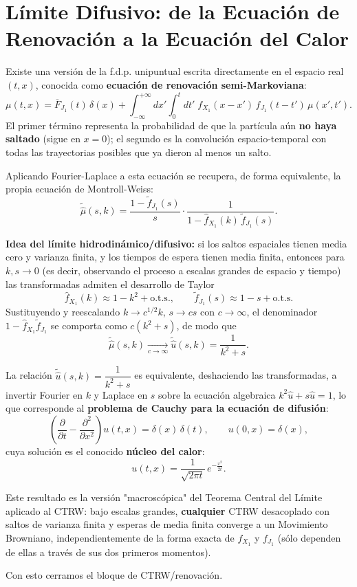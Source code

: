 \section{Límite Difusivo: de la Ecuación de Renovación a la Ecuación del Calor}

\noindent
Existe una versión de la f.d.p. unipuntual escrita directamente en el espacio real $(t,x)$, conocida como \textbf{ecuación de renovación semi-Markoviana}:
\[
\mu(t,x) = \overline{F}_{J_1}(t)\,\delta(x) + \int_{-\infty}^{+\infty} dx' \int_{0}^{t} dt' \; f_{X_1}(x-x')\, f_{J_1}(t-t')\, \mu(x',t').
\]
El primer término representa la probabilidad de que la partícula aún \textbf{no haya saltado} (sigue en $x=0$); el segundo es la convolución espacio-temporal con todas las trayectorias posibles que ya dieron al menos un salto.

\begin{observacion}
Aplicando Fourier-Laplace a esta ecuación se recupera, de forma equivalente, la propia ecuación de Montroll-Weiss:
\[
\widetilde{\hat{\mu}}(s,k) = \frac{1-\widetilde{f}_{J_1}(s)}{s} \cdot \frac{1}{1-\hat{f}_{X_1}(k)\,\widetilde{f}_{J_1}(s)}.
\]
\end{observacion}

\noindent
\textbf{Idea del límite hidrodinámico/difusivo:} si los saltos espaciales tienen media cero y varianza finita, y los tiempos de espera tienen media finita, entonces para $k,s \to 0$ (es decir, observando el proceso a escalas grandes de espacio y tiempo) las transformadas admiten el desarrollo de Taylor
\[
\hat{f}_{X_1}(k) \approx 1 - k^2 + \text{o.t.s.}, \qquad \widetilde{f}_{J_1}(s) \approx 1 - s + \text{o.t.s.}
\]
Sustituyendo y reescalando $k \to c^{1/2}k$, $s \to cs$ con $c \to \infty$, el denominador $1-\hat{f}_{X_1}\widetilde{f}_{J_1}$ se comporta como $c(k^2+s)$, de modo que
\[
\widetilde{\hat{\mu}}(s,k) \xrightarrow[c\to\infty]{} \widetilde{\hat{u}}(s,k) = \frac{1}{k^2+s}.
\]

\begin{teo}
La relación $\widetilde{\hat u}(s,k)=\dfrac{1}{k^2+s}$ es equivalente, deshaciendo las transformadas, a invertir Fourier en $k$ y Laplace en $s$ sobre la ecuación algebraica $k^2\hat u + s\hat u = 1$, lo que corresponde al \textbf{problema de Cauchy para la ecuación de difusión}:
\[
\left(\frac{\partial}{\partial t} - \frac{\partial^2}{\partial x^2}\right) u(t,x) = \delta(x)\,\delta(t), \qquad u(0,x)=\delta(x),
\]
cuya solución es el conocido \textbf{núcleo del calor}:
\[
u(t,x) = \frac{1}{\sqrt{2\pi t}}\, e^{-\frac{x^2}{2t}}.
\]
\end{teo}

\begin{observacion}
Este resultado es la versión "macroscópica" del Teorema Central del Límite aplicado al CTRW: bajo escalas grandes, \textbf{cualquier} CTRW desacoplado con saltos de varianza finita y esperas de media finita converge a un Movimiento Browniano, independientemente de la forma exacta de $f_{X_1}$ y $f_{J_1}$ (sólo dependen de ellas a través de sus dos primeros momentos). \\
\end{observacion}

\noindent
Con esto cerramos el bloque de CTRW/renovación.
